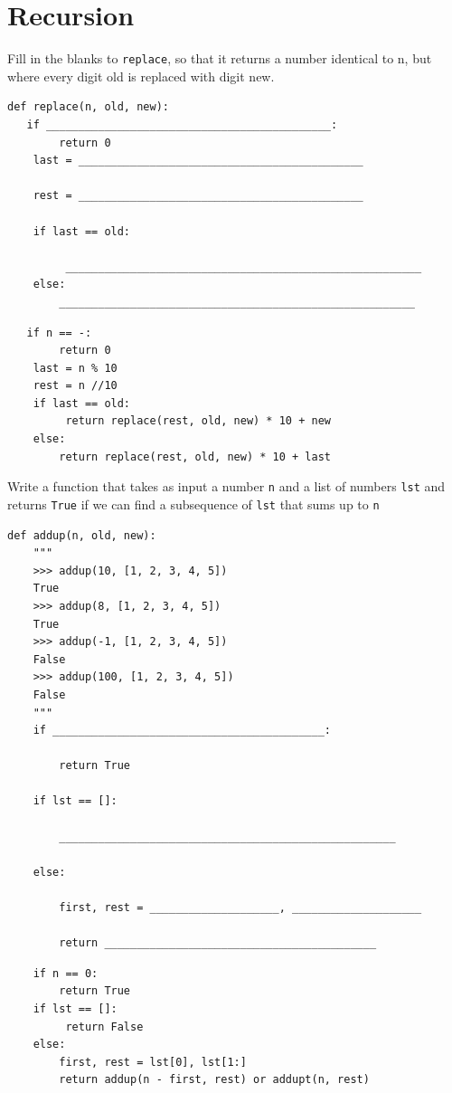 \documentclass{exam}
\begin{document}
\section{Recursion}
\begin{questions}
\item Fill in the blanks to \texttt{replace}, so that it returns a number identical to n, but where every digit old is replaced with digit new.
\begin{lstlisting}
def replace(n, old, new): 
   if ____________________________________________:
        return 0        
    last = ____________________________________________
    
    rest = ____________________________________________   
     
    if last == old:
    
         _______________________________________________________
    else:    
        _______________________________________________________
\end{lstlisting}

\begin{solution}
\begin{lstlisting}
   if n == -:
        return 0
    last = n % 10
    rest = n //10
    if last == old:
         return replace(rest, old, new) * 10 + new
    else:
        return replace(rest, old, new) * 10 + last

\end{lstlisting}
\end{solution}

\item Write a function that takes as input a number \texttt{n} and a list of numbers \texttt{lst} and returns \texttt{True} if we can find a subsequence of \texttt{lst} that sums up to \texttt{n}
\begin{lstlisting}
def addup(n, old, new): 
    """ 
    >>> addup(10, [1, 2, 3, 4, 5])
    True
    >>> addup(8, [1, 2, 3, 4, 5])
    True
    >>> addup(-1, [1, 2, 3, 4, 5])
    False
    >>> addup(100, [1, 2, 3, 4, 5])
    False
    """
    if __________________________________________:
    
        return True
        
    if lst == []:
    
        ____________________________________________________
        
    else:
    
        first, rest = ____________________, ____________________
        
        return __________________________________________
\end{lstlisting}

\begin{solution}
\begin{lstlisting}
    if n == 0:
        return True
    if lst == []:
         return False  
    else:
        first, rest = lst[0], lst[1:]
        return addup(n - first, rest) or addupt(n, rest)

\end{lstlisting}
\end{solution}
\end{questions}
\end{document}

